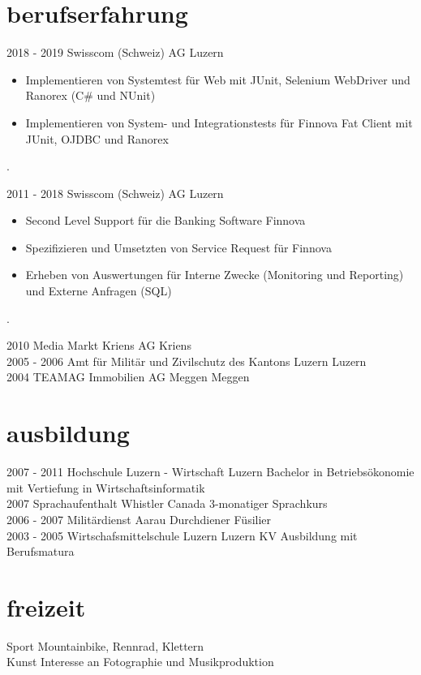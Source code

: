 \documentclass[]{cv-style} %
\begin{document}
\section{berufserfahrung}
\begin{entrylist}
\entry
{2018 - 2019}
{Swisscom (Schweiz) AG}
{Luzern}
{
\begin{itemize}
  \item Implementieren von Systemtest für Web mit JUnit, Selenium WebDriver und Ranorex (C\# und NUnit)
  \item Implementieren von System- und Integrationstests für Finnova Fat Client mit JUnit, OJDBC und Ranorex
\end{itemize}
.}
\entry
  {2011 - 2018}
  {Swisscom (Schweiz) AG}
  {Luzern}
  {
\begin{itemize}
  \item Second Level Support für die Banking Software Finnova 
  \item Spezifizieren und Umsetzten von Service Request für Finnova
  \item Erheben von Auswertungen für Interne Zwecke (Monitoring und Reporting) und Externe Anfragen (SQL)
\end{itemize}
.}
\entry
  {2010}
  {Media Markt Kriens AG}
  {Kriens}
  {}\\
\entry
  {2005 - 2006}
  {Amt für Militär und Zivilschutz des Kantons Luzern}
  {Luzern}
  {}\\
\entry
  {2004}
  {TEAMAG Immobilien AG Meggen}
  {Meggen}
  {}
\end{entrylist}
\section{ausbildung}
\begin{entrylist}
\entry
{2007 - 2011}
{Hochschule Luzern - Wirtschaft}
{Luzern}
{Bachelor in Betriebsökonomie mit Vertiefung in Wirtschaftsinformatik}\\
\entry
{2007}
{Sprachaufenthalt}
{Whistler Canada}
{3-monatiger Sprachkurs}\\
\entry
{2006 - 2007}
{Militärdienst}
{Aarau}
{Durchdiener Füsilier}\\
\entry
{2003 - 2005}
{Wirtschafsmittelschule Luzern}
{Luzern}
{KV Ausbildung mit Berufsmatura}
\end{entrylist} 
\section{freizeit}
\begin{entrylist}
\entry
{}
{Sport}
{}
{Mountainbike, Rennrad, Klettern}\\
\entry
{}
{Kunst}
{}
{Interesse an Fotographie und Musikproduktion}
\end{entrylist}
\end{document}
